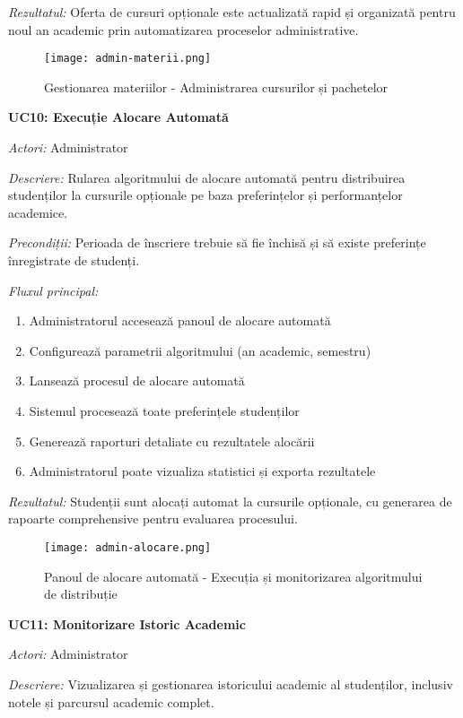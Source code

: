 \documentclass[12pt,a4paper]{report}
\begin{document}
\textit{Rezultatul:} Oferta de cursuri opționale este actualizată rapid și organizată pentru noul an academic prin automatizarea proceselor administrative.

\begin{figure}[H]
\centering
\texttt{[image: admin-materii.png]}
\caption{Gestionarea materiilor - Administrarea cursurilor și pachetelor}
\label{fig:admin-materii}
\end{figure}

\textbf{UC10: Execuție Alocare Automată}

\textit{Actori:} Administrator

\textit{Descriere:} Rularea algoritmului de alocare automată pentru distribuirea studenților la cursurile opționale pe baza preferințelor și performanțelor academice.

\textit{Precondiții:} Perioada de înscriere trebuie să fie închisă și să existe preferințe înregistrate de studenți.

\textit{Fluxul principal:}
\begin{enumerate}
\item Administratorul accesează panoul de alocare automată
\item Configurează parametrii algoritmului (an academic, semestru)
\item Lansează procesul de alocare automată
\item Sistemul procesează toate preferințele studenților
\item Generează raporturi detaliate cu rezultatele alocării
\item Administratorul poate vizualiza statistici și exporta rezultatele
\end{enumerate}

\textit{Rezultatul:} Studenții sunt alocați automat la cursurile opționale, cu generarea de rapoarte comprehensive pentru evaluarea procesului.

\begin{figure}[H]
\centering
\texttt{[image: admin-alocare.png]}
\caption{Panoul de alocare automată - Execuția și monitorizarea algoritmului de distribuție}
\label{fig:admin-alocare}
\end{figure}

\textbf{UC11: Monitorizare Istoric Academic}

\textit{Actori:} Administrator

\textit{Descriere:} Vizualizarea și gestionarea istoricului academic al studenților, inclusiv notele și parcursul academic complet.
\end{document}
